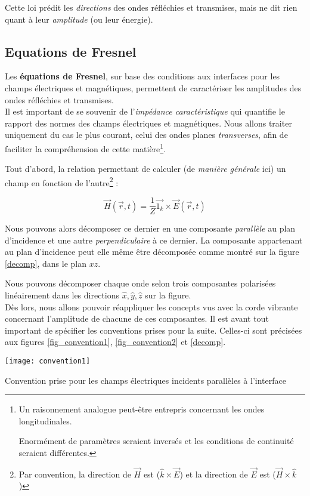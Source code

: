 Cette loi prédit les \textit{directions} des ondes réfléchies et transmises, mais ne dit rien quant à leur \textsl{amplitude} (ou leur énergie). 

\subsection{Equations de Fresnel}

Les \textbf{équations de Fresnel}, sur base des conditions aux interfaces pour les champs électriques et magnétiques, permettent de caractériser les amplitudes des ondes réfléchies et transmises. \\ 
Il est important de se souvenir de l'\textit{impédance caractéristique} qui quantifie le rapport des normes des champs électriques et magnétiques. Nous allons traiter uniquement du cas le plus courant, celui des ondes planes \textit{transverses}, afin de faciliter la compréhension de cette matière\footnote{Un raisonnement analogue peut-être entrepris concernant les ondes longitudinales.

Enormément de paramètres seraient inversés et les conditions de continuité seraient différentes.}.

Tout d'abord, la relation permettant de calculer (de \textit{manière générale} ici) un champ en fonction de l'autre\footnote{Par convention, la direction de $\vec{H}$ est ($\hat{k} \times \vec{E}$) et la direction de $\vec{E}$ est 
($ \vec{H} \times \hat{k}$) } : 

\[\vec{H}(\vec{r},t) = \frac{1}{Z}\vec{1_k} \times \vec{E}(\vec{r},t) \]%

Nous pouvons alors décomposer ce dernier en une composante \textit{parallèle} au plan d'incidence et une autre \textit{perpendiculaire} à ce dernier. La composante appartenant au plan d'incidence peut elle même être décomposée comme montré sur la figure \ref{decomp}, dans le plan $xz$.

Nous pouvons décomposer chaque onde selon trois composantes polarisées linéairement dans les directions $\hat{x}, \hat{y}, \hat{z}$ sur la figure. \\
Dès lors, nous allons pouvoir réappliquer les concepts vus avec la corde vibrante concernant l'amplitude de chacune de ces composantes. Il est avant tout important de spécifier les conventions prises pour la suite. Celles-ci sont précisées aux figures \ref{fig_convention1}, \ref{fig_convention2} et \ref{decomp}.
\begin{marginfigure}[-4cm]
\texttt{[image: convention1]}
\caption{Convention prise pour les champs électriques incidents parallèles à l'interface}
\label{fig_convention1}
\end{marginfigure}

